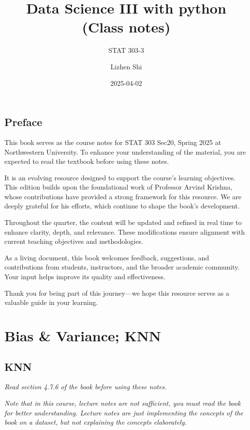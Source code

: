 \documentclass[
  letterpaper,
  DIV=11,
  numbers=noendperiod]{scrreprt}
\title{Data Science III with python (Class notes)}
\subtitle{STAT 303-3}
\author{Lizhen Shi}
\date{2025-04-02}
\renewcommand*\contentsname{Table of contents}
\newcommand\contentsname{Table of contents}
\begin{document}
\maketitle

\renewcommand*\contentsname{Table of contents}
{
\hypersetup{linkcolor=}
\setcounter{tocdepth}{2}
\tableofcontents
}


\chapter*{Preface}\label{preface}


This book serves as the course notes for STAT 303 Sec20, Spring 2025 at
Northwestern University. To enhance your understanding of the material,
you are expected to read the textbook before using these notes.

It is an evolving resource designed to support the course's learning
objectives. This edition builds upon the foundational work of Professor
Arvind Krishna, whose contributions have provided a strong framework for
this resource. We are deeply grateful for his efforts, which continue to
shape the book's development.

Throughout the quarter, the content will be updated and refined in real
time to enhance clarity, depth, and relevance. These modifications
ensure alignment with current teaching objectives and methodologies.

As a living document, this book welcomes feedback, suggestions, and
contributions from students, instructors, and the broader academic
community. Your input helps improve its quality and effectiveness.

Thank you for being part of this journey---we hope this resource serves
as a valuable guide in your learning.

\part{Bias \& Variance; KNN}

\chapter{KNN}\label{knn}

\emph{Read section 4.7.6 of the book before using these notes.}

\emph{Note that in this course, lecture notes are not sufficient, you
must read the book for better understanding. Lecture notes are just
implementing the concepts of the book on a dataset, but not explaining
the concepts elaborately.}
\end{document}
